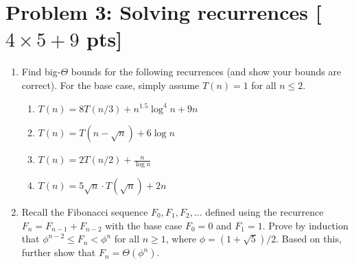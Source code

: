 \documentclass[11pt,twoside]{article}
\newcommand{\problem}[1]{\section*{Problem #1}}
\begin{document}
\problem{3: Solving recurrences [$4 \times 5+9$ pts]}
\begin{enumerate}
    \item Find big-$\Theta$ bounds for the following recurrences (and show your bounds are correct). For the base case, simply assume $T(n) = 1$ for all $n \leq 2$.
    \begin{enumerate}
        \item $T(n)=8T(n/3)+n^{1.5} \log^4 n + 9n$
        \item $T(n)=T(n-\sqrt{n}) + 6 \log n$
        \item $T(n)=2T(n/2)+ \frac{n}{\log n}$
        \item $T(n)= 5\sqrt{n} \cdot T(\sqrt{n}) + 2n$
    \end{enumerate}
    \item Recall the Fibonacci sequence $F_0,F_1,F_2,\dots$ defined using the recurrence $F_n = F_{n-1}+F_{n-2}$ with the base case $F_0 = 0$ and $F_1 = 1$. Prove by induction that $\phi^{n-2} \leq F_n < \phi^n$ for all $n \geq 1$, where $\phi = (1+\sqrt{5})/2$.
    Based on this, further show that $F_n = \Theta(\phi^n)$.
\end{enumerate}
\end{document}
